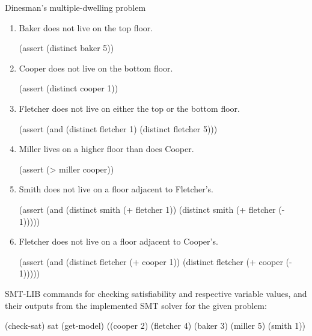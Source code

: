 \documentclass{beamer}
\begin{document}
\begin{frame}[fragile,t]
\begin{columns}[t,onlytextwidth]
\begin{column}{0.485\textwidth}
\begin{block}{Dinesman's multiple-dwelling problem}
\begin{enumerate}
				\item Baker does not live on the top floor.
				\begin{smtlib}
					(assert (distinct baker 5))
				\end{smtlib}
			
				\item Cooper does not live on the bottom floor.
				\begin{smtlib}
					(assert (distinct cooper 1))
				\end{smtlib}
				
				\item Fletcher does not live on either the top or the bottom floor.
				\begin{smtlib}
					(assert (and (distinct fletcher 1)
					             (distinct fletcher 5)))
				\end{smtlib}
			
				\item Miller lives on a higher floor than does Cooper.
				\begin{smtlib}
					(assert (> miller cooper))
				\end{smtlib}
			
				\item Smith does not live on a floor adjacent to Fletcher's.
				\begin{smtlib}
					(assert (and (distinct smith (+ fletcher 1))
					             (distinct smith (+ fletcher (- 1)))))
				\end{smtlib}
			
				\item Fletcher does not live on a floor adjacent to Cooper's.
				\begin{smtlib}
					(assert (and (distinct fletcher (+ cooper 1))
					             (distinct fletcher (+ cooper (- 1)))))
				\end{smtlib}
			\end{enumerate}
		
			SMT-LIB commands for checking satisfiability and respective variable values, and their outputs from the implemented SMT solver for the given problem:
			\begin{smtlib}
				(check-sat)
				sat
				(get-model)
				((cooper 2) (fletcher 4) (baker 3) (miller 5) (smith 1))
			\end{smtlib}
		\end{block}
	

\end{column}
\end{columns}
\end{frame}
\end{document}
